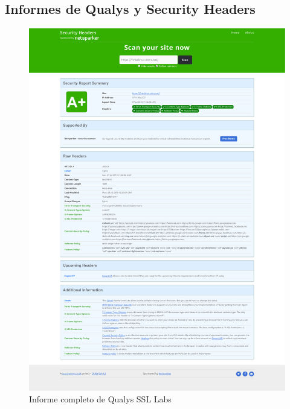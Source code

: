 \begin{appendices}
\chapter{Informes de Qualys y Security Headers}
\begin{figure}
  \label{tabla:informesecurityheaders}
  \includegraphics[width=\textwidth]{Material_Adicional/InformeSecurityHeaders}
  \caption{Informe completo de Qualys SSL Labs}
\end{figure}
\begin{figure}

\end{figure}
\end{appendices}
